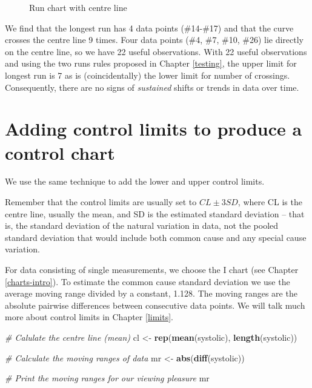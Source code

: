 \documentclass[
]{book}
\makeatletter
\newenvironment{Shaded}{\begin{snugshade}}{\end{snugshade}}
\newcommand{\CommentTok}[1]{\textcolor[rgb]{0.56,0.35,0.01}{\textit{#1}}}
\newcommand{\FunctionTok}[1]{\textcolor[rgb]{0.13,0.29,0.53}{\textbf{#1}}}
\newcommand{\NormalTok}[1]{#1}
\newcommand{\OtherTok}[1]{\textcolor[rgb]{0.56,0.35,0.01}{#1}}
\newcommand*\pandocbounded[1]{%
  \sbox\pandoc@box{#1}%
  \Gscale@div\@tempa{\textheight}{\dimexpr\ht\pandoc@box+\dp\pandoc@box\relax}%
  \Gscale@div\@tempb{\linewidth}{\wd\pandoc@box}%
  \ifdim\@tempb\p@<\@tempa\p@\let\@tempa\@tempb\fi%
  \ifdim\@tempa\p@<\p@\scalebox{\@tempa}{\usebox\pandoc@box}%
  \else\usebox{\pandoc@box}%
  \fi%
}
\makeatother
\begin{document}
\begin{figure}
\centering
\pandocbounded{}
\caption{\label{fig:first-chart-run2}Run chart with centre line}
\end{figure}

We find that the longest run has 4 data points (\#14-\#17) and that the curve crosses the centre line 9 times. Four data points (\#4, \#7, \#10, \#26) lie directly on the centre line, so we have 22 useful observations. With 22 useful observations and using the two runs rules proposed in Chapter \ref{testing}, the upper limit for longest run is 7 as is (coincidentally) the lower limit for number of crossings. Consequently, there are no signs of \emph{sustained} shifts or trends in data over time.

\section{Adding control limits to produce a control chart}\label{adding-control-limits-to-produce-a-control-chart}

We use the same technique to add the lower and upper control limits.

Remember that the control limits are usually set to \(CL \pm 3 SD\), where CL is the centre line, usually the mean, and SD is the estimated standard deviation -- that is, the standard deviation of the natural variation in data, not the pooled standard deviation that would include both common cause and any special cause variation.

For data consisting of single measurements, we choose the I chart (see Chapter \ref{charts-intro}). To estimate the common cause standard deviation we use the average moving range divided by a constant, 1.128. The moving ranges are the absolute pairwise differences between consecutive data points. We will talk much more about control limits in Chapter \ref{limits}.

\begin{Shaded}
\begin{Highlighting}[]
\CommentTok{\# Calulate the centre line (mean)}
\NormalTok{cl  }\OtherTok{\textless{}{-}} \FunctionTok{rep}\NormalTok{(}\FunctionTok{mean}\NormalTok{(systolic), }\FunctionTok{length}\NormalTok{(systolic))}

\CommentTok{\# Calculate the moving ranges of data}
\NormalTok{mr }\OtherTok{\textless{}{-}} \FunctionTok{abs}\NormalTok{(}\FunctionTok{diff}\NormalTok{(systolic))}

\CommentTok{\# Print the moving ranges for our viewing pleasure}
\NormalTok{mr}
\end{Highlighting}
\end{Shaded}
\end{document}

